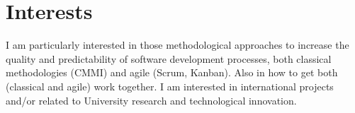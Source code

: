\documentclass[letterpaper]{twentysecondcv} %
\begin{document}







\makeprofile %


\section{Interests}

I am particularly interested in those methodological approaches to increase the quality and predictability of software development processes, both classical methodologies (CMMI) and agile (Scrum, Kanban). Also in how to get both (classical and agile) work together.
I am interested in international projects and/or related to University research and technological innovation.


\end{document}
